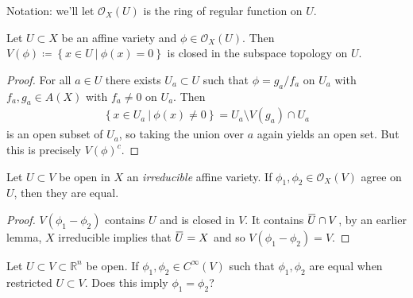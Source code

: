Notation: we'll let \({\mathcal{O}}_X(U)\) is the ring of regular
function on \(U\).

\begin{proposition}[?]

Let \(U\subset X\) be an affine variety and
\(\phi \in {\mathcal{O}}_X(U)\). Then
\(V(\phi) \coloneqq\left\{{x\in U {~\mathrel{\Big|}~}\phi(x) = 0}\right\}\)
is closed in the subspace topology on \(U\).

\end{proposition}

\begin{proof}

For all \(a\in U\) there exists \(U_a\subset U\) such that
\(\phi = g_a/f_a\) on \(U_a\) with \(f_a, g_a \in A(X)\) with
\(f_a \neq 0\) on \(U_a\). Then
\begin{align*}  
\left\{{x\in U_a {~\mathrel{\Big|}~}\phi(x) \neq 0}\right\} = U_a \setminus V(g_a)\cap U_a
\end{align*}
is an open subset of \(U_a\), so taking the union over \(a\) again
yields an open set. But this is precisely \(V(\phi)^c\).

\end{proof}

\begin{proposition}

Let \(U\subset V\) be open in \(X\) an \emph{irreducible} affine
variety. If \(\phi_1, \phi_2 \in {\mathcal{O}}_X(V)\) agree on \(U\),
then they are equal.

\end{proposition}

\begin{proof}

\(V(\phi_1 - \phi_2)\) contains \(U\) and is closed in \(V\). It
contains
\(\mkern 1.5mu\overline{\mkern-1.5muU\mkern-1.5mu}\mkern 1.5mu\cap V\),
by an earlier lemma, \(X\) irreducible implies that
\(\mkern 1.5mu\overline{\mkern-1.5muU\mkern-1.5mu}\mkern 1.5mu = X\) and
so \(V(\phi_1 - \phi_2) =V\).

\end{proof}

\begin{question}

Let \(U\subset V \subset {\mathbb{R}}^n\) be open. If
\(\phi_1, \phi_2 \in C^\infty(V)\) such that \(\phi_1, \phi_2\) are
equal when restricted \(U\subset V\). Does this imply
\(\phi_1 = \phi_2\)?

\end{question}

